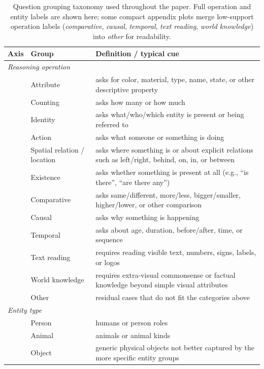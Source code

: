 \begin{table}[t]
\centering
\small
\setlength{\tabcolsep}{4pt}

\caption{Question grouping taxonomy used throughout the paper. Full operation and entity labels are shown here; some compact appendix plots merge low-support operation labels (\textit{comparative}, \textit{causal}, \textit{temporal}, \textit{text reading}, \textit{world knowledge}) into \textit{other} for readability.}
\label{tab:question_groupings}
\begin{tabular}{p{}p{}p{}}
\toprule
Axis & Group & Definition / typical cue \\
\midrule
\multicolumn{3}{l}{\textit{Reasoning operation}} \\
& Attribute & asks for color, material, type, name, state, or other descriptive property \\
& Counting & asks how many or how much \\
& Identity & asks what/who/which entity is present or being referred to \\
& Action & asks what someone or something is doing \\
& Spatial relation / location & asks where something is or about explicit relations such as left/right, behind, on, in, or between \\
& Existence & asks whether something is present at all (e.g., ``is there'', ``are there any'') \\
& Comparative & asks same/different, more/less, bigger/smaller, higher/lower, or other comparison \\
& Causal & asks why something is happening \\
& Temporal & asks about age, duration, before/after, time, or sequence \\
& Text reading & requires reading visible text, numbers, signs, labels, or logos \\
& World knowledge & requires extra-visual commonsense or factual knowledge beyond simple visual attributes \\
& Other & residual cases that do not fit the categories above \\
\midrule
\multicolumn{3}{l}{\textit{Entity type}} \\
& Person & humans or person roles \\
& Animal & animals or animal kinds \\
& Object & generic physical objects not better captured by the more specific entity groups \\

\end{tabular}
\end{table}
